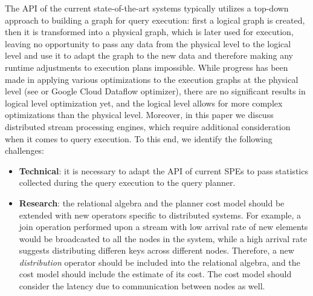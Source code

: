 The API of the current state-of-the-art systems typically utilizes a top-down approach to building a graph for query execution: first a logical graph is created, then it is transformed into a physical graph, which is later used for execution, leaving no opportunity to pass any data from the physical level to the logical level and use it to adapt the graph to the new data and therefore making any runtime adjustments to execution plans impossible. While progress has been made in applying various optimizations to the execution graphs at the physical level (see \cite{grulich2020grizzly} or Google Cloud Dataflow optimizer), there are no significant results in logical level optimization yet, and the logical level allows for more complex optimizations than the physical level. Moreover, in this paper we discuss distributed stream processing engines, which require additional consideration when it comes to query execution. To this end, we identify the following challenges:

\begin{itemize}
    \item \textbf{Technical}: it is necessary to adapt the API of current SPEs to pass statistics collected during the query execution to the query planner.
    \item \textbf{Research}: the relational algebra and the planner cost model should be extended with new operators specific to distributed systems. For example, a join operation performed upon a stream with low arrival rate of new elements would be broadcasted to all the nodes in the system, while a high arrival rate suggests distributing differen keys across different nodes. Therefore, a new \textit{distribution} operator should be included into the relational algebra, and the cost model should include the estimate of its cost. The cost model should consider the latency due to communication between nodes as well. 
\end{itemize}





